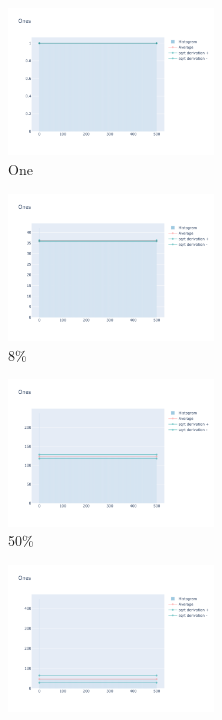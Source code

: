 \documentclass[12pt, fleqn]{report}                             %
\theoremstyle{break}                                            %
\begin{document}
      \begin{figure}[ht!]
        \centering
        \begin{subfigure}[b]{0.4\linewidth}
          \includegraphics[width=0.6\textwidth]{Images/34/dia-a.png}
          \caption{One}
        \end{subfigure}
        \begin{subfigure}[b]{0.4\linewidth}
          \includegraphics[width=0.6\textwidth]{Images/34/dia-b.png}
          \caption{8\%}
        \end{subfigure}
        \begin{subfigure}[b]{0.4\linewidth}
          \includegraphics[width=0.6\textwidth]{Images/34/dia-c.png}
          \caption{50\%}
        \end{subfigure}
        \begin{subfigure}[b]{0.4\linewidth}
          \includegraphics[width=0.6\textwidth]{Images/34/dia-d.png}

\end{subfigure}
\end{figure}
\end{document}
